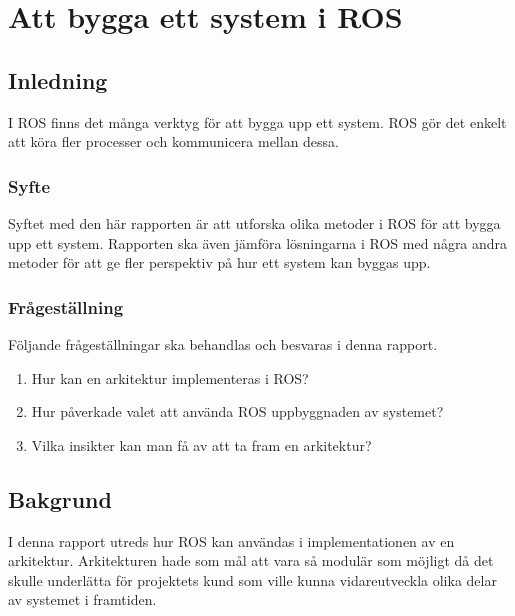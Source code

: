 \chapter{Att bygga ett system i ROS}
\label{cha:indiv-report-lundberg}

\section{Inledning}
\label{sec:introduction-lundberg}

I ROS finns det många verktyg för att bygga upp ett system. ROS gör det enkelt att köra fler processer och kommunicera mellan dessa.

\subsection{Syfte}
\label{sec:purpose-lundberg}

Syftet med den här rapporten är att utforska olika metoder i ROS för att bygga upp ett system. Rapporten ska även jämföra lösningarna i ROS med några andra metoder för att ge fler perspektiv på hur ett system kan byggas upp.

\subsection{Frågeställning}
\label{sec:issue-lundberg}

Följande frågeställningar ska behandlas och besvaras i denna rapport.

\begin{enumerate}
	\item Hur kan en arkitektur implementeras i ROS?
	
	\item Hur påverkade valet att använda ROS uppbyggnaden av systemet?
	
	\item Vilka insikter kan man få av att ta fram en arkitektur?
\end{enumerate}

\section{Bakgrund}
\label{sec:background-lundberg}

I denna rapport utreds hur ROS kan användas i implementationen av en arkitektur. Arkitekturen hade som mål att vara så modulär som möjligt då det skulle underlätta för projektets kund som ville kunna vidareutveckla olika delar av systemet i framtiden.

